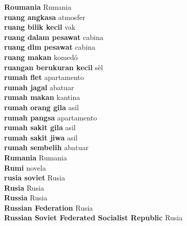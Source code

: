 \textbf{ Roumania  } Rumania \\
\textbf{ ruang angkasa  } atmosfer \\
\textbf{ ruang bilik kecil  } vak \\
\textbf{ ruang dalam pesawat  } cabina \\
\textbf{ ruang dlm pesawat  } cabina \\
\textbf{ ruang makan  } komedó \\
\textbf{ ruangan berukuran kecil  } sèl \\
\textbf{ rumah flet  } apartamento \\
\textbf{ rumah jagal  } abatuar \\
\textbf{ rumah makan  } kantina \\
\textbf{ rumah orang gila  } asil \\
\textbf{ rumah pangsa  } apartamento \\
\textbf{ rumah sakit gila  } asil \\
\textbf{ rumah sakit jiwa  } asil \\
\textbf{ rumah sembelih  } abatuar \\
\textbf{ Rumania  } Rumania \\
\textbf{ Rumi  } novela \\
\textbf{ rusia soviet  } Rusia \\
\textbf{ Rusia  } Rusia \\
\textbf{ Russia  } Rusia \\
\textbf{ Russian Federation  } Rusia \\
\textbf{ Russian Soviet Federated Socialist Republic  } Rusia \\
